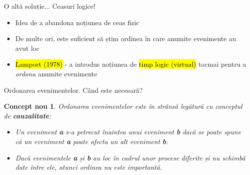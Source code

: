 \documentclass[9pt]{beamer}
\makeatletter
\newtheorem{concept}{Concept nou}
\newcommand\SoulColor{%
  \let\set@color\beamerorig@set@color
  \let\reset@color\beamerorig@reset@color}
\makeatother
\begin{document}
\begin{frame}{O altă soluție... Ceasuri logice!}
\begin{itemize}
    \item \Large{Idea de a abandona noțiunea de ceas fizic}
	\vskip10pt
	\item \Large{De multe ori, este suficient să știm ordinea în care anumite evenimente au avut loc}
	\vskip10pt
	\item \Large{\SoulColor\hl{Lamport (1978)} - a introdus noțiunea de \SoulColor\hl{timp logic (virtual)} tocmai pentru a \textit{ordona} anumite evenimente}
\end{itemize}
\end{frame}

\begin{frame}{Ordonarea evenimentelor. Când este necesară?}
\begin{concept}
\Large{Ordonarea evenimentelor este în strânsă legătură cu conceptul de \textbf{cauzalitate}:}
\begin{itemize}
    \vskip10pt
    \item Un eveniment \textbf{a} s-a petrecut înaintea unui eveniment \textbf{b} dacă se poate spune că un eveniment \textbf{a} poate afecta un alt eveniment \textbf{b}.
	\vskip10pt
	\item Dacă evenimentele \textbf{a} și \textbf{b} au loc în cadrul unor procese diferite și nu schimbă date între ele, atunci ordinea nu este importantă.
\end{itemize}
\end{concept}
\end{frame}
\end{document}
